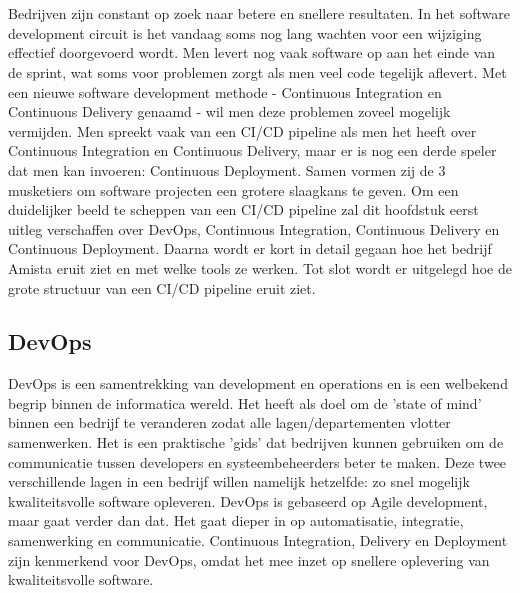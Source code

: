 \chapter{}
\label{ch:stand-van-zaken}

Bedrijven zijn constant op zoek naar betere en snellere resultaten. In het software development circuit is het vandaag soms nog lang wachten voor een wijziging effectief doorgevoerd wordt. Men levert nog vaak software op aan het einde van de sprint, wat soms voor problemen zorgt als men veel code tegelijk aflevert. Met een nieuwe software development methode - Continuous Integration en Continuous Delivery genaamd - wil men deze problemen zoveel mogelijk vermijden. Men spreekt vaak van een CI/CD pipeline als men het heeft over Continuous Integration en Continuous Delivery, maar er is nog een derde speler dat men kan invoeren: Continuous Deployment. Samen vormen zij de 3 musketiers om software projecten een grotere slaagkans te geven.
Om een duidelijker beeld te scheppen van een CI/CD pipeline zal dit hoofdstuk eerst uitleg verschaffen over DevOps, Continuous Integration, Continuous Delivery en Continuous Deployment. Daarna wordt er kort in detail gegaan hoe het bedrijf Amista eruit ziet en met welke tools ze werken. Tot slot wordt er uitgelegd hoe de grote structuur van een CI/CD pipeline eruit ziet.

\section{DevOps}
\label{sec:devops}
    DevOps is een samentrekking van development en operations en is een welbekend begrip binnen de informatica wereld. Het heeft als doel om de 'state of mind' binnen een bedrijf te veranderen zodat alle lagen/departementen vlotter samenwerken. Het is een praktische 'gids' dat bedrijven kunnen gebruiken om de communicatie tussen developers en systeembeheerders beter te maken. Deze twee verschillende lagen in een bedrijf willen namelijk hetzelfde: zo snel mogelijk kwaliteitsvolle software opleveren. DevOps is gebaseerd op Agile development, maar gaat verder dan dat. Het gaat dieper in op automatisatie, integratie, samenwerking en communicatie. 
    Continuous Integration, Delivery en Deployment zijn kenmerkend voor DevOps, omdat het mee inzet op snellere oplevering van kwaliteitsvolle software. ~\autocite{Riti2018}
    
